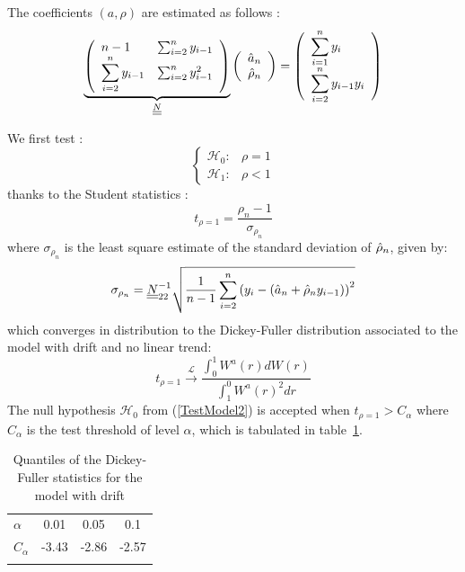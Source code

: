 The coefficients $(a,\rho)$ are estimated as follows :
\begin{equation}\label{Model2Estim}
  \underbrace{\left(\begin{array}{lll}
      \displaystyle n-1  &\sum_{i=2}^n y_{i-1}\\
      \displaystyle \sum_{i=2}^n y_{i-1} &\sum_{i=2}^n y_{i-1}^2
    \end{array}
    \right)}_{{\underline{\underline{N}}}}
  \left(\begin{array}{c}
    \hat{a}_n\\
    \hat{\rho}_n
  \end{array}
  \right)=
  \left(
  \begin{array}{l}
    \displaystyle \sum_{i=1}^n y_{i} \\
    \displaystyle \sum_{i=2}^n y_{i-1} y_{i}
  \end{array}
  \right)
\end{equation}


We first test :
\begin{equation}\label{TestModel2}
  \left\{
  \begin{array}{lr}
    \mathcal{H}_0 :  & \rho = 1 \\
    \mathcal{H}_1 : & \rho < 1
  \end{array}
  \right.
\end{equation}
thanks to the Student statistics :
\begin{equation}\label{stdtStat}
  t_{\rho=1} = \frac{\rho_n-1}{\sigma_{\rho_n}}
\end{equation}
where $\sigma_{\rho_n}$ is the least square estimate of the standard deviation of $\Hat{\rho}_n$, given by:
\begin{equation}
  \sigma_{\rho_n}={\underline{\underline{N}}}^{-1}_{22}\sqrt{\frac{1}{n-1}\sum_{i=2}^n\left(y_{i}-(\hat{a}_n+\hat{\rho}_ny_{i-1})\right)^2}
\end{equation}
which converges in distribution to the Dickey-Fuller distribution associated to the model with drift and no linear trend:
\begin{equation}
  t_{\rho = 1} \stackrel{\mathcal{L}}{\longrightarrow} \frac{\int_{0}^{1}W^{a}(r) dW(r)}{\int_{1}^{0} W^{a}(r)^2 dr}
\end{equation}
The null hypothesis $\mathcal{H}_0$ from (\ref{TestModel2}) is accepted when $t_{\rho=1} > C_{\alpha}$ where $C_{\alpha}$ is the test threshold of level $\alpha$, which is tabulated in table~\ref{DickeyFullerPval2}.\\

\begin{table}
  \centering
  \begin{tabular}{lccc}
    \hline\noalign{\smallskip}
    $\alpha$ & 0.01 & 0.05 & 0.1 \\
    \noalign{\smallskip}\hline\noalign{\smallskip}
    $C_{\alpha}$ & -3.43 & -2.86 & -2.57 \\
    \noalign{\smallskip}\hline
  \end{tabular}
  \caption{Quantiles of the Dickey-Fuller statistics for the model with drift}\label{DickeyFullerPval2}
\end{table}

